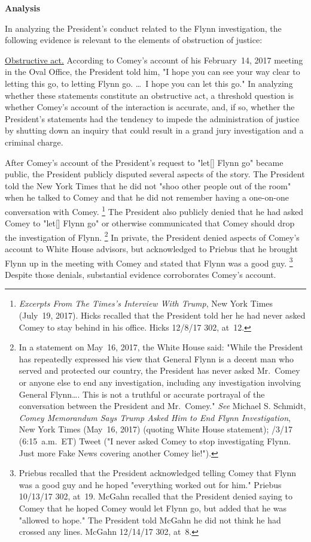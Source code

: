 \begin{center}
\textbf{Analysis}
\end{center}

In analyzing the President's conduct related to the Flynn investigation, the following evidence is relevant to the elements of obstruction of justice:

\underline{Obstructive act.}
According to Comey's account of his February~14, 2017 meeting in the Oval Office, the President told him, "I hope you can see your way clear to letting this go, to letting Flynn go. \dots\ I hope you can let this go."
In analyzing whether these statements constitute an obstructive act, a threshold question is whether Comey's account of the interaction is accurate, and, if so, whether the President's statements had the tendency to impede the administration of
justice by shutting down an inquiry that could result in a grand jury investigation and a criminal charge.

After Comey's account of the President's request to "let[] Flynn go" became public, the President publicly disputed several aspects of the story.
The President told the New York Times that he did not "shoo other people out of the room" when he talked to Comey and that he did not remember having a one-on-one conversation with Comey.%
\footnote{\textit{Excerpts From The Times's Interview With Trump}, New York Times (July~19, 2017).
Hicks recalled that the President told her he had never asked Comey to stay behind in his office.
Hicks 12/8/17 302, at~12.}
The President also publicly denied that he had asked Comey to "let[] Flynn go" or otherwise communicated that Comey should drop the investigation of Flynn.%
\footnote{In a statement on May~16, 2017, the White House said:
"While the President has repeatedly expressed his view that General Flynn is a decent man who served and protected our country, the President has never asked Mr.~Comey or anyone else to end any investigation, including any investigation involving General Flynn\dots.
This is not a truthful or accurate portrayal of the conversation between the President and Mr.~Comey."
\textit{See} Michael S. Schmidt, \textit{Comey Memorandum Says Trump Asked Him to End Flynn Investigation}, New York Times (May~16, 2017) (quoting White House statement);
/3/17 (6:15~a.m.~ET) Tweet ("I never asked Comey to stop investigating Flynn.
Just more Fake News covering another Comey lie!").}
In private, the President denied aspects of Comey's account to White House advisors, but acknowledged to Priebus that he brought Flynn up in the meeting with Comey and stated that Flynn was a good guy.%
\footnote{Priebus recalled that the President acknowledged telling Comey that Flynn was a good guy and he hoped "everything worked out for him."
Priebus 10/13/17 302, at~19.
McGahn recalled that the President denied saying to Comey that he hoped Comey would let Flynn go, but added that he was "allowed to hope."
The President told McGahn he did not think he had crossed any lines.
McGahn 12/14/17 302, at~8.}
Despite those denials, substantial evidence corroborates Comey's account.

